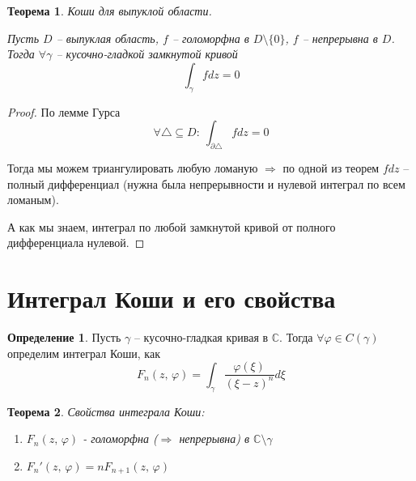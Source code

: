 \documentclass[a4paper,12pt]{article}
\renewcommand{\phi}{\ensuremath{\varphi}}
\theoremstyle{plain}
\newtheorem{theorem}{Теорема}[section]
\theoremstyle{definition}
\newtheorem{definition}{Определение}[section]
\theoremstyle{remark}
\begin{document}
\begin{theorem}
	Коши для выпуклой области.

	Пусть $D$ -- выпуклая область, $f$ -- голоморфна в $D \setminus \{0\}$, $f$ -- непрерывна в $D$. Тогда $\forall \gamma$ -- кусочно-гладкой замкнутой кривой
	\[
		\int_\gamma fdz = 0
	\]
\end{theorem}

\begin{proof}
	По лемме Гурса
	\[
		\forall \triangle \subseteq D :\: \int_{\partial \triangle} fdz = 0
	\]

	Тогда мы можем триангулировать любую ломаную $\Rightarrow$ по одной из теорем $fdz$ -- полный дифференциал (нужна была непрерывности и нулевой интеграл по всем ломаным).

	А как мы знаем, интеграл по любой замкнутой кривой от полного дифференциала нулевой.
\end{proof}

\section{Интеграл Коши и его свойства}
\begin{definition}
	Пусть $\gamma$ -- кусочно-гладкая кривая в $\mathbb{C}$. Тогда $\forall \phi \in C(\gamma)$ определим интеграл Коши, как
	\[
		F_n(z,\, \phi) = \int_\gamma \frac{\phi(\xi)}{(\xi - z)^n}d\xi
	\]
\end{definition}

\begin{theorem}
	Свойства интеграла Коши:
	\begin{enumerate}
		\item $F_n(z,\, \phi)$ - голоморфна ($\Rightarrow$ непрерывна) в $\mathbb{C} \setminus \gamma$
		\item $F_n'(z,\, \phi) = nF_{n + 1}(z,\, \phi)$
	\end{enumerate}
\end{theorem}
\end{document}
